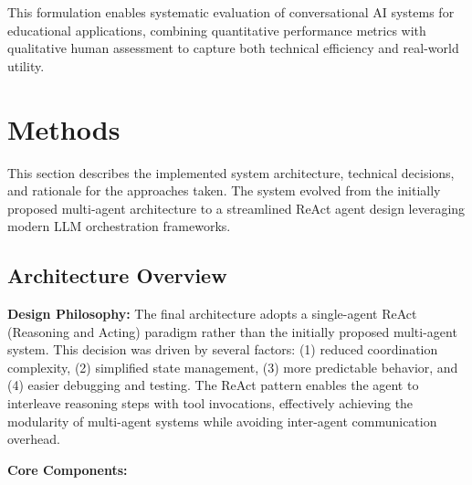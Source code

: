 \documentclass{article}
\begin{document}
This formulation enables systematic evaluation of conversational AI systems for educational applications, combining quantitative performance metrics with qualitative human assessment to capture both technical efficiency and real-world utility.

\section{Methods}

This section describes the implemented system architecture, technical decisions, and rationale for the approaches taken. The system evolved from the initially proposed multi-agent architecture to a streamlined ReAct agent design leveraging modern LLM orchestration frameworks.

\subsection{Architecture Overview}

\textbf{Design Philosophy:} The final architecture adopts a single-agent ReAct (Reasoning and Acting) paradigm \cite{yao2023react} rather than the initially proposed multi-agent system. This decision was driven by several factors: (1) reduced coordination complexity, (2) simplified state management, (3) more predictable behavior, and (4) easier debugging and testing. The ReAct pattern enables the agent to interleave reasoning steps with tool invocations, effectively achieving the modularity of multi-agent systems while avoiding inter-agent communication overhead.

\textbf{Core Components:}
\end{document}
